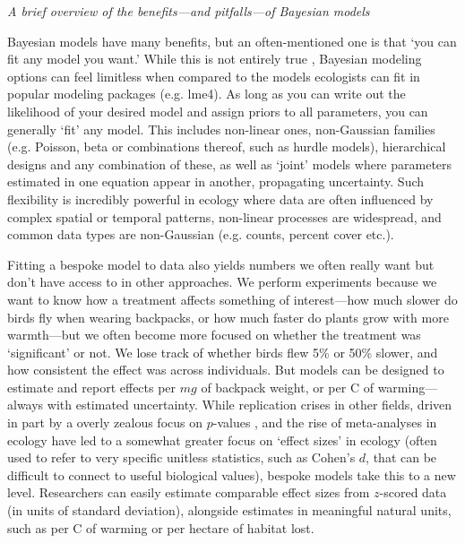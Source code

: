 \documentclass[11pt]{article}
\begin{document}
{%

\emph{A brief overview of the benefits---and pitfalls---of Bayesian models} 

Bayesian models have many benefits, but an often-mentioned one is that `you can fit any model you want.' While this is not entirely true \citep{BDA,reid2019}, Bayesian modeling options can feel limitless when compared to the models ecologists can fit in popular modeling packages (e.g. \textsf{lme4}). As long as you can write out the likelihood of your desired model \citep[and sometimes even if you can't;][]{Sunnaaker2013} and assign priors to all parameters, you can generally `fit' any model. This includes non-linear ones, non-Gaussian families (e.g. Poisson, beta or combinations thereof, such as hurdle models), hierarchical designs and any combination of these, as well as `joint' models where parameters estimated in one equation appear in another, propagating uncertainty. Such flexibility is incredibly powerful in ecology where data are often influenced by complex spatial or temporal patterns, non-linear processes are widespread, and common data types are non-Gaussian (e.g. counts, percent cover etc.). 

Fitting a bespoke model to data also yields numbers we often really want but don't have access to in other approaches. We perform experiments because we want to know how a treatment affects something of interest---how much slower do birds fly when wearing backpacks, or how much faster do plants grow with more warmth---but we often become more focused on whether the treatment was `significant' or not. We lose track of whether birds flew 5\% or 50\% slower, and how consistent the effect was across individuals. But models can be designed to estimate and report effects per $mg$ of backpack weight, or per \degree C of warming---always with estimated uncertainty. While replication crises in other fields, driven in part by a overly zealous focus on $p$-values \citep{halsey2015,loken2017}, and the rise of meta-analyses in ecology \citep{Hampton2013} have led to a somewhat greater focus on `effect sizes' in ecology (often used to refer to very specific unitless statistics, such as Cohen's $d$, that can be difficult to connect to useful biological values), bespoke models take this to a new level. Researchers can easily estimate comparable effect sizes from $z$-scored data (in units of standard deviation), alongside estimates in meaningful natural units, such as per \degree C of warming or per hectare of habitat lost.

}
\end{document}
